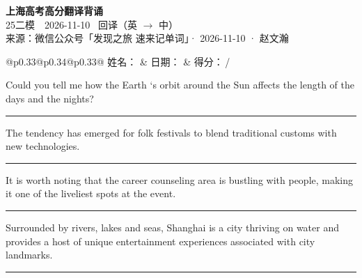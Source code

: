 \documentclass[11pt,a4paper]{article}
\newcommand{\num}[1]{\makebox[1.9em][r]{#1.}\hspace{0.3em}}
\newcommand{\wline}{\noindent\rule{\linewidth}{0.4pt}}
\begin{document}
\pagestyle{plain}
\begin{center}
{\LARGE\bfseries 上海高考高分翻译背诵 }\\[0.25em]
{\large 25二模　2026-11-10 \quad\ 回译（英 $\to$ 中）}\\[0.35em]
{\footnotesize 来源：微信公众号「发现之旅 速来记单词」· 2026-11-10 · 赵文瀚}
\end{center}

\vspace{0.4em}
\noindent\begin{tabular}{@{}p{0.33\textwidth}@{}p{0.34\textwidth}@{}p{0.33\textwidth}@{}}
姓名：\underline{\hspace{2.0cm}} & 日期：\underline{\hspace{2.0cm}} & 得分：\underline{\hspace{1.4cm}}\,/ \\
\end{tabular}

\vspace{0.5em}

\vspace{0.8em}
\num{1}Could you tell me how the Earth ‘s orbit around the Sun affects the length of the days and the nights?

\vspace{0.25em}

\wline

\num{2}The tendency has emerged for folk festivals to blend traditional customs with new technologies.

\vspace{0.25em}

\wline

\num{3}It is worth noting that the career counseling area is bustling with people, making it one of the liveliest spots at the event.

\vspace{0.25em}

\wline

\num{4}Surrounded by rivers, lakes and seas, Shanghai is a city thriving on water and provides a host of unique entertainment experiences associated with city landmarks.

\vspace{0.25em}

\wline
\end{document}
